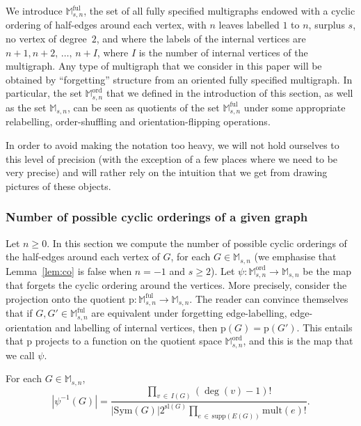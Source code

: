 \documentclass[AHL,Unicode,longabstracts,published]{cedram}
\newcommand{\abs}[1]{\left\lvert#1\right\rvert}
\newcommand{\supp}{\mathrm{supp}}
\newcommand{\ord}{\mathrm{ord}}
\newcommand{\sll}{\mathrm{sl}}
\newcommand{\rmp}{\mathrm{p}}
\newcommand{\Sym}{\mathrm{Sym}}
\newcommand{\mult}{\mathrm{mult}}
\newcommand{\ful}{\mathrm{ful}}
\newcommand{\M}{\mathbb{M}}
\begin{document}
We introduce $\M_{s,n}^{\ful}$, the set of all fully specified multigraphs endowed with a cyclic ordering of half-edges around each vertex, with $n$ leaves labelled $1$ to $n$, surplus $s$, no vertex of degree~$2$, and where the labels of the internal vertices are $n+1, n+2,\,\dots,\,n+I$, where $I$ is the number of internal vertices of the multigraph. Any type of multigraph that we consider in this paper will be obtained by ``forgetting'' structure from an oriented fully specified multigraph. In particular, the set $\M^{\ord}_{s,n}$ that we defined in the introduction of this section, as well as the set $\M_{s,n}$, can be seen as quotients of the set $\M_{s,n}^{\ful}$ under some appropriate relabelling, order-shuffling and orientation-flipping operations.


In order to avoid making the notation too heavy, we will not hold ourselves to this level of precision (with the exception of a few places where we need to be very precise) and will rather rely on the intuition that we get from drawing pictures of these objects.


\subsubsection{Number of possible cyclic orderings of a given graph}
Let $n\geq 0$. In this section we compute the number of possible cyclic orderings of the half-edges around each vertex of $G$, for each $G\in \M_{s,n}$ (we emphasise that Lemma~\ref{lem:co} is false when $n=-1$ and $s\geq 2$). Let $\psi:\M_{s,n}^{\ord}\rightarrow \M_{s,n}$ be the map that forgets the cyclic ordering around the vertices. More precisely, consider the projection onto the quotient $\rmp:\M_{s,n}^{\ful}\rightarrow \M_{s,n}$. The reader can convince themselves that if $G,G'\in \M_{s,n}^{\ful}$ are equivalent under forgetting edge-labelling, edge-orientation and labelling of internal vertices, then $\rmp(G)=\rmp(G')$. This entails that $\rmp$ projects to a function on the quotient space $\M_{s,n}^{\ord}$, and this is the map that we call $\psi$.

\begin{lemm}\label{lem:co}
For each $G \in \M_{s,n}$,
\begin{equation*}\label{eq:nb of cyclic orderings}
\left|\psi^{-1}(G) \right|=\frac{\prod\limits_{v\,\in\,I(G)}(\deg(v) -1)!}{\abs{\Sym(G)} 2^{\sll(G)} \prod\limits_{e\,\in\,\supp(E(G))}\mult(e)!}.
\end{equation*}
\end{lemm}
\end{document}
